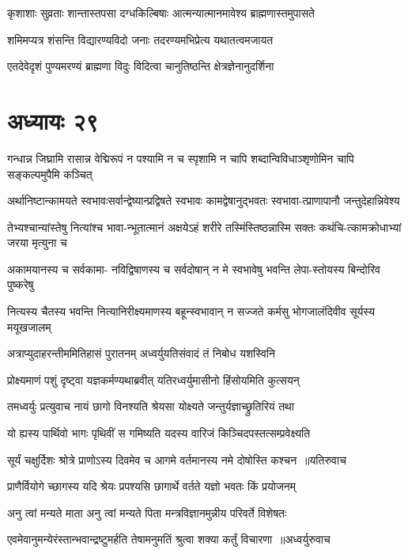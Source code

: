 \twolineshloka
{कृशाशाः सुव्रताः शान्तास्तपसा दग्धकिल्बिषाः}
{आत्मन्यात्मानमावेश्य ब्राह्मणास्तमुपासते}


\twolineshloka
{शमिमप्यत्र शंसन्ति विद्यारण्यविदो जनाः}
{तदरण्यमभिप्रेत्य यथातत्वमजायत}


\twolineshloka
{एतदेवेदृशं पुण्यमरण्यं ब्राह्मणा विदुः}
{विदित्वा चानुतिष्ठन्ति क्षेत्रज्ञेनानुदर्शिना}


\chapter{अध्यायः २९}
\twolineshloka
{गन्धान्न जिघ्रामि रासान्न वेद्मिरूपं न पश्यामि न च स्पृशामि}
{न चापि शब्दान्विविधाञ्शृणोमिन चापि सङ्कल्पमुपैमि कञ्चित्}


\twolineshloka
{अर्थानिष्टान्कामयते स्वभावःसर्वान्द्वेष्यान्प्रद्विषते स्वभावः}
{कामद्वेषानुद्भवतः स्वभावा-त्प्राणापानौ जन्तुदेहान्निवेश्य}


\twolineshloka
{तेभ्यश्चान्यांस्तेषु नित्यांश्च भावा-न्भूतात्मानं अक्षयेऽहं शरीरे}
{तस्मिंस्तिष्ठन्नास्मि सक्तः कथंचि-त्कामक्रोधाभ्यां जरया मृत्युना च}


\twolineshloka
{अकामयानस्य च सर्वकामा- नविद्विषाणस्य च सर्वदोषान्}
{न मे स्वभावेषु भवन्ति लेपा-स्तोयस्य बिन्दोरिव पुष्करेषु}


\twolineshloka
{नित्यस्य चैतस्य भवन्ति नित्यानिरीक्ष्यमाणस्य बहून्स्वभावान्}
{न सज्जते कर्मसु भोगजालंदिवीव सूर्यस्य मयूखजालम्}


\twolineshloka
{अत्राप्युदाहरन्तीममितिहासं पुरातनम्}
{अध्वर्युयतिसंवादं तं निबोध यशस्विनि}


\twolineshloka
{प्रोक्ष्यमाणं पशुं दृष्ट्वा यज्ञकर्मण्यथाब्रवीत्}
{यतिरध्वर्युमासीनो हिंसोयमिति कुत्सयन्}


\twolineshloka
{तमध्वर्युः प्रत्युवाच नायं छागो विनश्यति}
{श्रेयसा योक्ष्यते जन्तुर्यज्ञाच्छ्रुतिरियं तथा}


\twolineshloka
{यो ह्यस्य पार्थिवो भागः पृथिवीं स गमिष्यति}
{यदस्य वारिजं किञ्चिदपस्तत्सम्प्रवेक्ष्यति}


\threelineshloka
{सूर्यं चक्षुर्दिशः श्रोत्रे प्राणोऽस्य दिवमेव च}
{आगमे वर्तमानस्य नमे दोषोस्ति कश्चन ॥यतिरुवाच}
{}


\twolineshloka
{प्राणैर्वियोगे च्छागस्य यदि श्रेयः प्रपश्यसि}
{छागार्थे वर्तते यज्ञो भवतः किं प्रयोजनम्}


\twolineshloka
{अनु त्वां मन्यते माता अनु त्वां मन्यते पिता}
{मन्त्रविज्ञानमुन्नीय परिवर्ते विशेषतः}


\threelineshloka
{एवमेवानुमन्येरंस्तान्भवान्द्रष्टुमर्हति}
{तेषामनुमतिं श्रुत्वा शक्या कर्तुं विचारणा ॥अध्वर्युरुवाच}
{}


